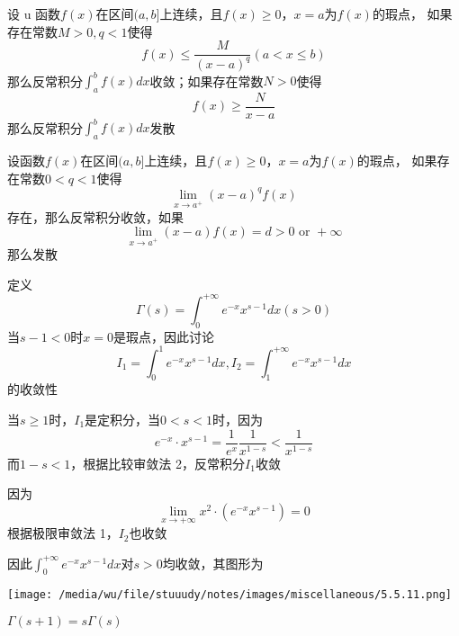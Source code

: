 \documentclass[11pt]{article}
\begin{document}
\begin{theorem}[比较审敛法 2]
设 u 函数\(f(x)\)在区间\((a,b]\)上连续，且\(f(x)\ge0\)，\(x=a\)为\(f(x)\)的瑕点，
如果存在常数\(M>0,q<1\)使得
\begin{equation*}
f(x)\le\frac{M}{(x-a)^q}(a<x\le b)
\end{equation*}
那么反常积分\(\int_a^bf(x)dx\)收敛；如果存在常数\(N>0\)使得
\begin{equation*}
f(x)\ge\frac{N}{x-a}
\end{equation*}
那么反常积分\(\int_a^bf(x)dx\)发散
\end{theorem}

\begin{theorem}[极限审敛法 2]
设函数\(f(x)\)在区间\((a,b]\)上连续，且\(f(x)\ge0\)，\(x=a\)为\(f(x)\)的瑕点，
如果存在常数\(0<q<1\)使得
\begin{equation*}
\lim_{x\to a^+}(x-a)^qf(x)
\end{equation*}
存在，那么反常积分收敛，如果
\begin{equation*}
\lim_{x\to a^+}(x-a)f(x)=d>0\text{ or }+\infty
\end{equation*}
那么发散
\end{theorem}

定义
\begin{equation*}
\Gamma(s)=\int_0^{+\infty}e^{-x}x^{s-1}dx(s>0)
\end{equation*}
当\(s-1<0\)时\(x=0\)是瑕点，因此讨论
\begin{equation*}
 I_1=\int_0^1e^{-x}x^{s-1}dx,I_2=\int_1^{+\infty}e^{-x}x^{s-1}dx
\end{equation*}
的收敛性

当\(s\ge1\)时，\(I_1\)是定积分，当\(0<s<1\)时，因为
\begin{equation*}
e^{-x}\cdot x^{s-1}=\frac{1}{e^x}\frac{1}{x^{1-s}}<\frac{1}{x^{1-s}}
\end{equation*}
而\(1-s<1\)，根据比较审敛法 2，反常积分\(I_1\)收敛

因为
\begin{equation*}
\lim_{x\to+\infty}x^2\cdot(e^{-x}x^{s-1})=0
\end{equation*}
根据极限审敛法 1，\(I_2\)也收敛

因此\(\int_0^{+\infty}e^{-x}x^{s-1}dx\)对\(s>0\)均收敛，其图形为
\begin{center}
\texttt{[image: /media/wu/file/stuuudy/notes/images/miscellaneous/5.5.11.png]}
\end{center}

\begin{proposition}[递推公式]
\(\Gamma(s+1)=s\Gamma(s)\)
\end{proposition}
\end{document}
